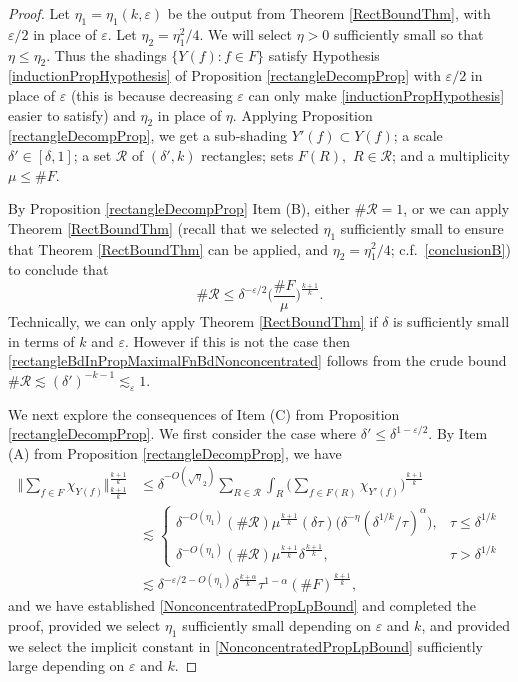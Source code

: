 \documentclass[letterpaper, reqno,11pt]{article}
\numberwithin{equation}{section}
\newcommand{\eps}{\varepsilon}
\numberwithin{thm}{section}
\theoremstyle{remark}
\begin{document}
\begin{proof}
Let $\eta_1=\eta_1(k,\eps)$ be the output from Theorem \ref{RectBoundThm}, with $\eps/2$ in place of $\eps$. Let $\eta_2 = \eta_1^2/4$. We will select $\eta>0$ sufficiently small so that $\eta\leq\eta_2$. Thus the shadings $\{Y(f)\colon f\in F\}$ satisfy Hypothesis \eqref{inductionPropHypothesis} of Proposition \ref{rectangleDecompProp} with $\eps/2$ in place of $\eps$ (this is because decreasing $\eps$ can only make \eqref{inductionPropHypothesis} easier to satisfy) and $\eta_2$ in place of $\eta$. Applying Proposition \ref{rectangleDecompProp}, we get a sub-shading $Y'(f)\subset Y(f)$; a scale $\delta'\in [\delta,1]$; a set $\mathcal{R}$ of $(\delta', k)$ rectangles; sets $F(R),$ $R\in\mathcal{R}$; and a multiplicity $\mu\leq\#F$. 


By Proposition \ref{rectangleDecompProp} Item (B), either $\#\mathcal{R}=1$, or we can apply Theorem \ref{RectBoundThm} (recall that we selected $\eta_1$ sufficiently small to ensure that Theorem \ref{RectBoundThm} can be applied, and $\eta_2 = \eta_1^2/4$; c.f.~\eqref{conclusionB}) to conclude that
\begin{equation}\label{rectangleBdInPropMaximalFnBdNonconcentrated}
\# \mathcal{R} \leq \delta^{-\eps/2}  \Big(\frac{\# F}{\mu}\Big)^{\frac{k+1}{k}}.
\end{equation}
Technically, we can only apply Theorem \ref{RectBoundThm} if $\delta$ is sufficiently small in terms of $k$ and $\eps$. However if this is not the case then \eqref{rectangleBdInPropMaximalFnBdNonconcentrated} follows from the crude bound $\# \mathcal{R}\lesssim (\delta')^{-k-1}\lesssim_{\eps}1$.


We next explore the consequences of Item (C) from Proposition \ref{rectangleDecompProp}. We first consider the case where $\delta'\leq\delta^{1-\eps/2}$. By Item (A) from Proposition \ref{rectangleDecompProp}, we have 
\begin{equation}
\begin{split}
\Big \Vert \sum_{f\in F}\chi_{Y(f)}\Big\Vert_{\frac{k+1}{k}}^{\frac{k+1}{k}} 
& \leq \delta^{-O(\sqrt \eta_2)}\sum_{R\in\mathcal{R}} \int_{R}\Big(\sum_{f\in F(R)}\chi_{Y'(f)}\Big)^{\frac{k+1}{k}}\\
& \lesssim \left\{ \begin{array}{ll} \delta^{-O(\eta_1)}(\#\mathcal{R}) \mu^{\frac{k+1}{k}} (\delta\tau)\Big( \delta^{-\eta}(\delta^{1/k}/\tau)^{\alpha}\Big), & \tau\leq\delta^{1/k} \\ \delta^{-O(\eta_1)}(\#\mathcal{R}) \mu^{\frac{k+1}{k}} \delta^{\frac{k+1}{k}}, & \tau>\delta^{1/k} \end{array}\right. \\
& \lesssim\delta^{-\eps/2 -O(\eta_1)}\delta^{\frac{k+\alpha}{k}}\tau^{1-\alpha}  (\#F)^{\frac{k+1}{k}},
\end{split}
\end{equation}
and we have established \eqref{NonconcentratedPropLpBound} and completed the proof, provided we select $\eta_1$ sufficiently small depending on $\eps$ and $k$, and provided we select the implicit constant in \eqref{NonconcentratedPropLpBound} sufficiently large depending on $\eps$ and $k$.


\end{proof}
\end{document}
